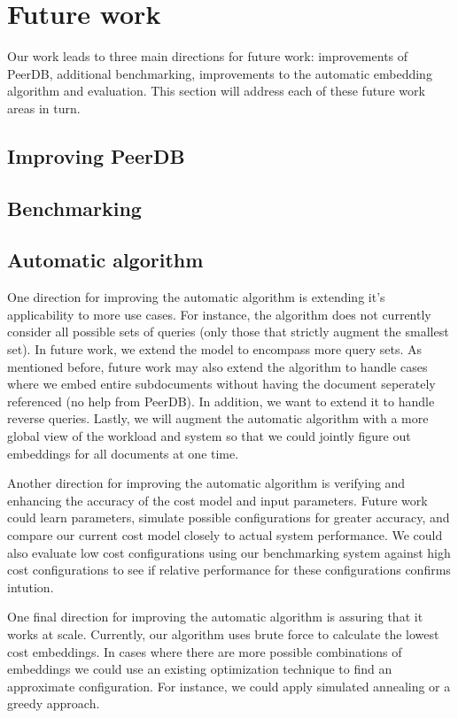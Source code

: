 \section{Future work}
Our work leads to three main directions for future work: improvements of PeerDB, additional benchmarking, improvements to the automatic embedding algorithm and evaluation.
This section will address each of these future work areas in turn.

\subsection{Improving PeerDB}

\subsection{Benchmarking}

\subsection{Automatic algorithm}
One direction for improving the automatic algorithm is extending it's applicability to more use cases. For instance, the algorithm does not currently consider all possible sets of queries (only those that strictly augment the smallest set). In future work, we extend the model to encompass more query sets. As mentioned before, future work may also extend the algorithm to handle cases where we embed entire subdocuments without having the document seperately referenced (no help from PeerDB). In addition, we want to extend it to handle reverse queries. Lastly, we will augment the automatic algorithm with a more global view of the workload and system so that we could jointly figure out embeddings for all documents at one time.

Another direction for improving the automatic algorithm is verifying and enhancing the accuracy of the cost model and input parameters. 
Future work could learn parameters, simulate possible configurations for greater accuracy, and compare our current cost model closely to actual system performance. 
We could also evaluate low cost configurations using our benchmarking system against high cost configurations to see if relative performance for these configurations confirms intution.

One final direction for improving the automatic algorithm is assuring that it works at scale. Currently, our algorithm uses brute force to calculate the lowest cost embeddings. In cases where there are more possible combinations of embeddings we could use an existing optimization technique to find an approximate configuration. For instance, we could apply simulated annealing or a greedy approach.

